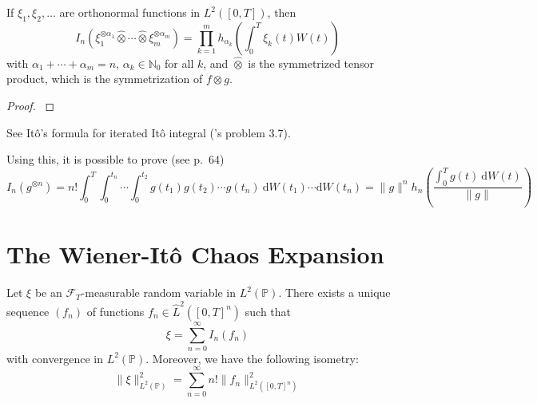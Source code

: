 \begin{proposition}\label{prop:202311031501}
    If \(\xi_1, \xi_2, \ldots\) are orthonormal
    functions in \(L^2([0,T])\), then \[
    I_n(\xi_1^{\otimes \alpha_1} \hat{\otimes} \cdots \hat{\otimes} \xi_m^{\otimes \alpha_m}) = \prod_{k=1}^m h_{\alpha_k} \left( \int_0^T \xi_k(t) W(t) \right)
    \] with \(\alpha_1 + \cdots +\alpha_m = n\),
    \(\alpha_k \in \mathbb{N}_0\) for all \(k\), and \(\hat{\otimes}\) is
    the symmetrized tensor product, which is the symmetrization of
    \(f \otimes g\).
\end{proposition}

\begin{proof}
    \cite{ito1951multiple}
\end{proof}

See Itô's formula for iterated Itô integral
(\cite{oksendal2013stochastic}'s problem 3.7).

Using this, it is possible to prove (see
\cite{nualart2018introduction} p.~64) \[
I_n(g^{\otimes n}) = n! \int_0^T \int_0^{t_n} \cdots \int_0^{t_2} g(t_1) g(t_2) \cdots g(t_n) ~\mathrm{d}W(t_1) \cdots \mathrm{d}W(t_n) = \| g \|^n h_n \left( \frac{\int_0^T g(t) ~\mathrm{d}W(t)}{\| g \|} \right)
\]

\section{The Wiener-Itô Chaos Expansion}

\begin{theorem}\label{thm:chaos-expansion}
    Let $\xi$ be an $\mathcal{F}_T$-measurable random variable in $L^2(\mathbb{P})$. There exists a unique sequence $(f_n)$ of functions $f_n \in \hat{L}^2([0,T]^n)$ such that
    $$
    \xi = \sum_{n=0}^\infty I_n(f_n)
    $$
    with convergence in $L^2(\mathbb{P})$. Moreover, we have the following isometry:
    $$
    \| \xi \|_{L^2(\mathbb{P})}^2 = \sum_{n=0}^\infty n! \| f_n \|_{L^2([0,T]^n)}^2
    $$
\end{theorem}

